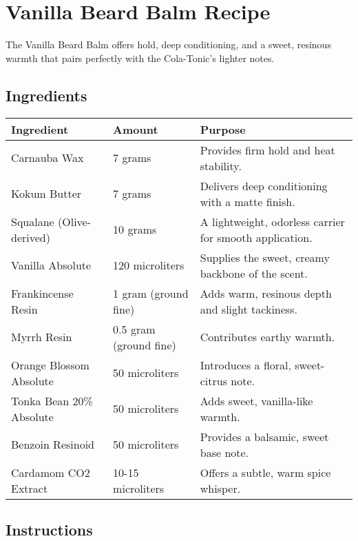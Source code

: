 \documentclass{article}
\begin{document}
\section*{Vanilla Beard Balm Recipe}

The Vanilla Beard Balm offers hold, deep conditioning, and a sweet, resinous warmth that pairs perfectly with the Cola-Tonic's lighter notes.

\subsection*{Ingredients}

\begin{center}
\begin{tabular}{p{4.5cm} p{2.5cm} p{8cm}}
\toprule
\textbf{Ingredient} & \textbf{Amount} & \textbf{Purpose} \\
\midrule
Carnauba Wax & 7 grams & Provides firm hold and heat stability. \\
Kokum Butter & 7 grams & Delivers deep conditioning with a matte finish. \\
Squalane (Olive-derived) & 10 grams & A lightweight, odorless carrier for smooth application. \\
Vanilla Absolute & 120 microliters & Supplies the sweet, creamy backbone of the scent. \\
Frankincense Resin & 1 gram (ground fine) & Adds warm, resinous depth and slight tackiness. \\
Myrrh Resin & 0.5 gram (ground fine) & Contributes earthy warmth. \\
Orange Blossom Absolute & 50 microliters & Introduces a floral, sweet-citrus note. \\
Tonka Bean 20\% Absolute & 50 microliters & Adds sweet, vanilla-like warmth. \\
Benzoin Resinoid & 50 microliters & Provides a balsamic, sweet base note. \\
Cardamom CO2 Extract & 10-15 microliters & Offers a subtle, warm spice whisper. \\
\bottomrule
\end{tabular}
\end{center}

\subsection*{Instructions}
\end{document}
